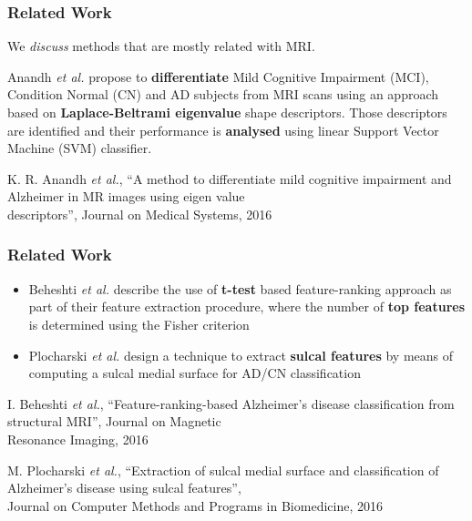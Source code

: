 \begin{frame}
	\frametitle{Related Work}
	
	\Large
	
	\vspace{1cm}
	
	We \emph{discuss} methods that are mostly related with MRI.
	
	\vspace{0.3cm}
	
	Anandh \emph{et al.} \cite{Anandh16} propose to \textbf{differentiate} Mild Cognitive Impairment
	(MCI), Condition Normal (CN) and AD subjects from MRI scans using an approach based on
	\textbf{Laplace-Beltrami eigenvalue} shape descriptors. Those descriptors are identified and their
	performance is \textbf{analysed} using linear Support Vector Machine (SVM) classifier.
	
	\vspace{0.72cm}
	
	\tiny
	
	\cite{Anandh16} K. R. Anandh \emph{et al.}, ``A method to differentiate mild cognitive impairment
	and Alzheimer in MR images using eigen value\\ \hspace{0.25cm} descriptors'', Journal on Medical
	Systems, 2016
\end{frame}

\begin{frame}
	\frametitle{Related Work}
	
	\Large
	
	\vspace{1cm}
	
	\begin{itemize}
		\item Beheshti \emph{et al.} \cite{Beheshti16} describe the use of \textbf{t-test} based
			  feature-ranking approach as part of their feature extraction procedure, where the number
			  of \textbf{top features} is determined using the Fisher criterion
		\vspace{0.2cm}
		\item Plocharski \emph{et al.} \cite{Plocharski16} design a technique to extract \textbf{sulcal
			  features} by means of computing a sulcal medial surface for AD/CN classification
	\end{itemize}
	
	\vspace{0.7cm}
	
	\tiny
	
	\cite{Beheshti16} I. Beheshti \emph{et al.}, ``Feature-ranking-based Alzheimer's disease
	classification from structural MRI'', Journal on Magnetic\\ \hspace{0.25cm} Resonance Imaging, 2016
	
	\cite{Plocharski16} M. Plocharski \emph{et al.}, ``Extraction of sulcal medial surface and
	classification of Alzheimer's disease using sulcal features'',\\ \hspace{0.25cm} Journal on
	Computer Methods and Programs in Biomedicine, 2016
\end{frame}

